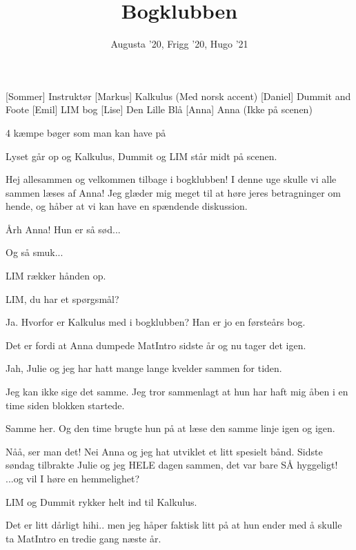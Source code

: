 \documentclass[a4paper,11pt]{article}
\title{Bogklubben}
\author{Augusta '20, Frigg '20, Hugo '21}
\begin{document}
\maketitle

\begin{roles}
[Sommer] Instruktør
[Markus] Kalkulus (Med norsk accent)
[Daniel] Dummit and Foote  
[Emil] LIM bog 
[Lise] Den Lille Blå
[Anna] Anna (Ikke på scenen)
\end{roles}

\begin{props}
 4 kæmpe bøger som man kan have på
\end{props}


\begin{sketch}

\scene Lyset går op og Kalkulus, Dummit og LIM står midt på scenen. 

 Hej allesammen og velkommen tilbage i bogklubben! I denne uge skulle vi alle sammen læses af Anna! Jeg glæder mig meget til at høre jeres betragninger om hende, og håber at vi kan have en spændende diskussion. 

 Årh Anna! Hun er så sød...

 Og så smuk...

\scene LIM rækker hånden op.

 LIM, du har et spørgsmål? 

 Ja. Hvorfor er Kalkulus med i bogklubben? Han er jo en førsteårs bog. 

 Det er fordi at Anna dumpede MatIntro sidste år og nu tager det igen.

 Jah, Julie og jeg har hatt mange lange kvelder sammen for tiden. 

  Jeg kan ikke sige det samme. Jeg tror sammenlagt at hun har haft mig åben i en time siden blokken startede. 

  Samme her. Og den time brugte hun på at læse den samme linje igen og igen. 

 Nåå, ser man det! Nei Anna og jeg hat utviklet et litt spesielt bånd. Sidste søndag tilbrakte Julie og jeg HELE dagen sammen, det var bare SÅ hyggeligt! ...og vil I høre en hemmelighet? 

\scene LIM og Dummit rykker helt ind til Kalkulus. 

 Det er litt dårligt hihi.. men jeg håper faktisk litt på at hun ender med å skulle ta MatIntro en tredie gang næste år. 


\end{sketch}
\end{document}
